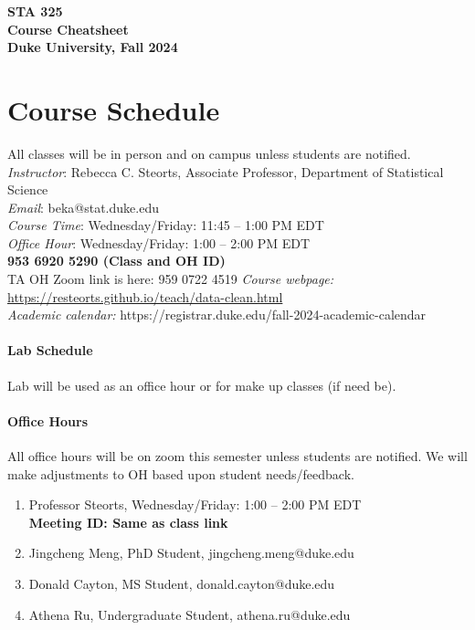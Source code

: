 \documentclass[11pt]{article}
\date{}
\begin{document}
\begin{center}
{\Large\bf STA 325\\ Course Cheatsheet} \\

{\Large\bf Duke University, Fall 2024} \\
\end{center}


\section{Course Schedule}
All classes will be in person and on campus unless students are notified. \\
\emph{Instructor}: Rebecca C. Steorts,  Associate Professor,  Department of Statistical Science\\
\emph{Email}: beka@stat.duke.edu\\
\emph{Course Time}: Wednesday/Friday: 11:45 -- 1:00 PM EDT \\
\emph{Office Hour}: Wednesday/Friday: 1:00 -- 2:00 PM EDT \\
\textbf{953 6920 5290 (Class and OH ID)}\\
TA OH Zoom link is here: 959 0722 4519
\emph{Course webpage:} \url{https://resteorts.github.io/teach/data-clean.html} \\
\emph{Academic calendar:} https://registrar.duke.edu/fall-2024-academic-calendar


\paragraph{Lab Schedule}
Lab will be used as an office hour or for make up classes (if need be). 





\paragraph{Office Hours}
All office hours will be on zoom this semester unless students are notified. We will make adjustments to OH based upon student needs/feedback. 
\begin{enumerate}
\item Professor Steorts, Wednesday/Friday: 1:00 -- 2:00 PM EDT \\
\textbf{Meeting ID: Same as class link}
\item Jingcheng Meng, PhD Student, jingcheng.meng@duke.edu\\
\item Donald Cayton, MS Student, donald.cayton@duke.edu\\
\item Athena Ru, Undergraduate Student, athena.ru@duke.edu \\ 
\end{enumerate}
\end{document}
